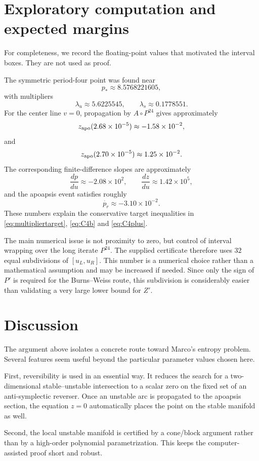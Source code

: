 \documentclass[11pt]{article}
\newcommand{\pr}{p_r}
\begin{document}
\section{Exploratory computation and expected margins}\label{sec:exploratory}

For completeness, we record the floating-point values that motivated the
interval boxes.  They are not used as proof.

The symmetric period-four point was found near
\[
 p_*\approx8.5768221605,
\]
with multipliers
\[
 \lambda_u\approx5.6225545,
 \qquad
 \lambda_s\approx0.1778551.
\]
For the center line $v=0$, propagation by $A\circ P^{24}$ gives
approximately
\[
 z_{\rm apo}(2.68\times10^{-5})\approx-1.58\times10^{-2},
\]
and
\[
 z_{\rm apo}(2.70\times10^{-5})\approx1.25\times10^{-2}.
\]
The corresponding finite-difference slopes are approximately
\[
 \frac{dp}{du}\approx-2.08\times10^2,
 \qquad
 \frac{dz}{du}\approx1.42\times10^5,
\]
and the apoapsis event satisfies roughly
\[
 \dot{\pr}\approx-3.10\times10^{-2}.
\]
These numbers explain the conservative target inequalities in
\eqref{eq:multipliertarget}, \eqref{eq:C4b} and \eqref{eq:C4plus}.

The main numerical issue is not proximity to zero, but control of interval
wrapping over the long iterate $P^{24}$.  The supplied certificate therefore
uses $32$ equal subdivisions of $[u_L,u_R]$.  This number is a numerical
choice rather than a mathematical assumption and may be increased if needed.
Since only the sign of $P'$ is required for the Burns--Weiss route, this
subdivision is considerably easier than validating a very large lower bound
for $Z'$.

\section{Discussion}

The argument above isolates a concrete route toward Marco's entropy problem.
Several features seem useful beyond the particular parameter values chosen
here.

First, reversibility is used in an essential way.  It reduces the search for
a two-dimensional stable--unstable intersection to a scalar zero on the
fixed set of an anti-symplectic reverser.  Once an unstable arc is propagated
to the apoapsis section, the equation $z=0$ automatically places the point
on the stable manifold as well.

Second, the local unstable manifold is certified by a cone/block argument
rather than by a high-order polynomial parametrization.  This keeps the
computer-assisted proof short and robust.
\end{document}

